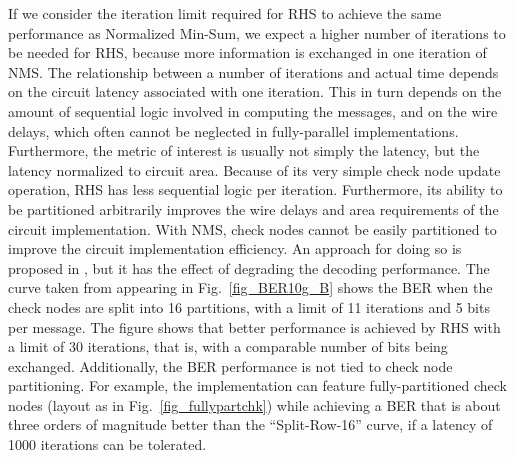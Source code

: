\documentclass[12pt,journal,twoside,draftcls,onecolumn]{IEEEtran}
\begin{document}
If we consider the iteration limit required for RHS to achieve the same performance as Normalized Min-Sum, we expect a higher number of iterations to be needed for RHS, because more information is exchanged in one iteration of NMS. 
The relationship between a number of iterations and actual time depends on the circuit latency associated with one iteration. This in turn depends on the amount of sequential logic involved in computing the messages, and on the wire delays, which often cannot be neglected in fully-parallel implementations. Furthermore, the metric of interest is usually not simply the latency, but the latency normalized to circuit area.
Because of its very simple check node update operation, RHS has less sequential logic per iteration. Furthermore, its ability to be partitioned arbitrarily improves the wire delays and area requirements of the circuit implementation.
With NMS, check nodes cannot be easily partitioned to improve the circuit implementation efficiency. An approach for doing so is proposed in \cite{mohsenin:2010}, but it has the effect of degrading the decoding performance. The curve taken from \cite{mohsenin:2010} appearing in Fig.~\ref{fig_BER10g_B} shows the BER when the check nodes are split into 16 partitions, with a limit of 11 iterations and 5 bits per message. The figure shows that better performance is achieved by RHS with a limit of 30 iterations, that is, with a comparable number of bits being exchanged.
Additionally, the BER performance is not tied to check node partitioning. For example, the implementation can feature fully-partitioned check nodes (layout as in Fig.~\ref{fig_fullypartchk}) while achieving a BER that is about three orders of magnitude better than the ``Split-Row-16'' curve, if a latency of 1000 iterations can be tolerated.
\end{document}
